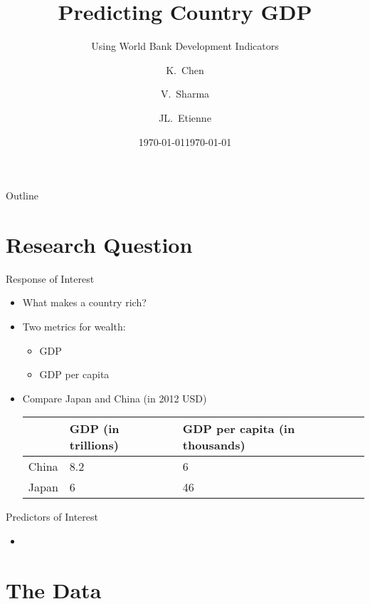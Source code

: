 \documentclass{beamer}
\title{Predicting Country GDP}
\subtitle{Using World Bank Development Indicators}
\date{\today}
\author{K.~Chen\inst{1} \and V.~Sharma\inst{1} \and JL.~Etienne\inst{1}}
\institute[Williams College] 
{
  \inst{1}
  Statistics 202 \\
  Williams College
}
\date{\today}
\begin{document}
\begin{frame}
\titlepage
\end{frame}

\begin{frame}{Outline}
\tableofcontents%
\end{frame}


\section{Research Question}
\begin{frame}{Response of Interest}
\begin{itemize}
\item What makes a country rich?
\item Two metrics for wealth:
  \begin{itemize}
    \item GDP
      \item GDP per capita
        \end{itemize}
\item Compare Japan and China (in 2012 USD)
\begin{table}
    \begin{tabular}{| l | l | l |} \hline
    ~     & GDP (in trillions) & GDP per capita (in thousands) \\ \hline
    China & 8.2                            & 6                                         \\ \hline
    Japan & 6                              & 46                                        \\ \hline
    \end{tabular}
\end{table}
\end{itemize}
\end{frame}

\begin{frame}{Predictors of Interest}
\begin{itemize}
\item 
\end{itemize}
\end{frame}


\section{The Data}
\end{document}
